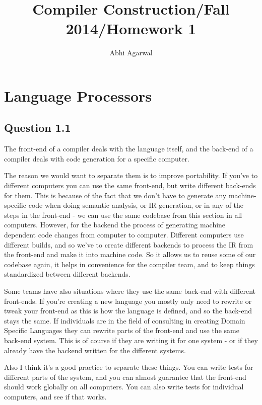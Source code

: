 \documentclass[11pt, oneside]{article}
\title{Compiler Construction/Fall 2014/Homework 1}
\author{Abhi Agarwal}
\date{}
\begin{document}
\maketitle

\section{Language Processors}
\subsection{Question 1.1}
\par The front-end of a compiler deals with the language itself, and the back-end of a compiler deals with code generation for a specific computer. 
\par The reason we would want to separate them is to improve portability. If you've to different computers you can use the same front-end, but write different back-ends for them. This is because of the fact that we don't have to generate any machine-specific code when doing semantic analysis, or IR generation, or in any of the steps in the front-end - we can use the same codebase from this section in all computers. However, for the backend the process of generating machine dependent code changes from computer to computer. Different computers use different builds, and so we've to create different backends to process the IR from the front-end and make it into machine code. So it allows us to reuse some of our codebase again, it helps in convenience for the compiler team, and to keep things standardized between different backends.
\par Some teams have also situations where they use the same back-end with different front-ends. If you're creating a new language you mostly only need to rewrite or tweak your front-end as this is how the language is defined, and so the back-end stays the same. If individuals are in the field of consulting in creating Domain Specific Languages they can rewrite parts of the front-end and use the same back-end system. This is of course if they are writing it for one system - or if they already have the backend written for the different systems.
\par Also I think it's a good practice to separate these things. You can write tests for different parts of the system, and you can almost guarantee that the front-end should work globally on all computers. You can also write tests for individual computers, and see if that works.
\end{document}
